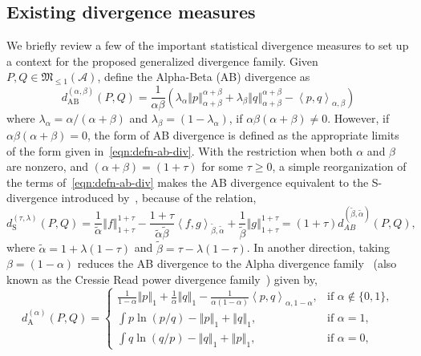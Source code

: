 \documentclass[11pt]{article}
\theoremstyle{plain}
\theoremstyle{remark}
\newcommand{\Acal}{\mathcal{A}}
\newcommand{\Mfrak}{\mathfrak{M}}
\newcommand{\norm}[1]{\left\Vert #1 \right\Vert}
\newcommand{\inner}[1]{\left\langle #1\right\rangle}
\begin{document}
\subsection{Existing divergence measures}\label{sec:existing-divergences}

We briefly review a few of the important statistical divergence measures to set up a context for the proposed generalized divergence family. Given $P, Q \in \Mfrak_{\leq 1}(\Acal)$, \cite{cichocki2011generalized} define the Alpha-Beta (AB) divergence as
\begin{equation}
    d_{\mathrm{AB}}^{(\alpha,\beta)}(P, Q)
    = \dfrac{1}{\alpha\beta}\left( \lambda_\alpha \norm{p}_{\alpha+\beta}^{\alpha+\beta} + \lambda_\beta \norm{q}_{\alpha+\beta}^{\alpha+\beta} - \inner{p,q}_{\alpha,\beta} \right)
    \label{eqn:defn-ab-div}
\end{equation}
\noindent where $\lambda_\alpha = \alpha/(\alpha+\beta)$ and $\lambda_\beta = (1 - \lambda_\alpha)$, if $\alpha\beta(\alpha+\beta)\neq 0$. However, if $\alpha\beta(\alpha+\beta) = 0$, the form of AB divergence is defined as the appropriate limits of the form given in~\eqref{eqn:defn-ab-div}. With the restriction when both $\alpha$ and $\beta$ are nonzero, and $(\alpha + \beta) = (1 + \tau)$ for some $\tau \geq 0$, a simple reorganization of the terms of~\eqref{eqn:defn-ab-div} makes the AB divergence equivalent to the S-divergence introduced by~\cite{ghosh2017generalized}, because of the relation,
\begin{equation*}
    d_{\mathrm{S}}^{(\tau,\lambda)}(P, Q)
    = \frac{1}{\tilde{\alpha}} \norm{f}_{1+\tau}^{1+\tau} - \frac{1+\tau}{\tilde{\alpha}\tilde{\beta}}\inner{f,g}_{\tilde{\beta}, \tilde{\alpha}} + \frac{1}{\tilde{\beta}}\norm{g}_{1+\tau}^{1+\tau} = (1+\tau)d_{AB}^{(\tilde{\beta}, \tilde{\alpha})}(P, Q),
\end{equation*}
\noindent where $\tilde{\alpha} = 1 + \lambda(1-\tau)$ and $\tilde{\beta} = \tau - \lambda(1-\tau)$.
\noindent In another direction, taking $\beta = (1 - \alpha)$ reduces the AB divergence to the Alpha divergence family~\citep{chernoff1952measure} (also known as the Cressie Read power divergence family~\citep{cressie1984multinomial}) given by,
\begin{equation}
    d_{\mathrm{A}}^{(\alpha)}(P, Q)
    = \begin{cases}
        \frac{1}{1-\alpha} \norm{p}_1 + \frac{1}{\alpha}\norm{q}_1 - \frac{1}{\alpha(1-\alpha)} \inner{p,q}_{\alpha,1-\alpha}, & \text{if } \alpha \notin \{ 0, 1 \}, \\
        \int p\ln(p/q) - \norm{p}_1 + \norm{q}_1,                                                                              & \text{if } \alpha = 1,               \\
        \int q\ln(q/p) - \norm{q}_1 + \norm{p}_1,                                                                              & \text{if } \alpha = 0,
    \end{cases}
    \label{eqn:defn-a-div}
\end{equation}
\end{document}
